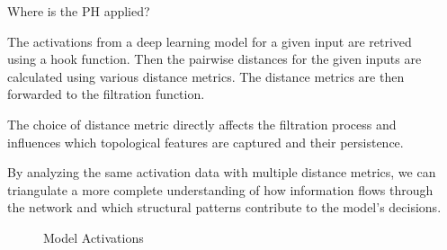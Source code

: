 \documentclass[final]{beamer}
\newlength{\sepwidth}
\newlength{\colwidth}
\newcommand{\separatorcolumn}{\begin{column}{\sepwidth}\end{column}}
\begin{document}
\begin{frame}[t]
\begin{columns}[t]
  \separatorcolumn

  \begin{column}{\colwidth}
  
  
  
      \begin{block} {Where is the PH applied?}

        The activations from a deep learning model for a given input are retrived using a hook function. Then the pairwise distances for the given inputs are calculated using various distance metrics. The distance metrics are then forwarded to the filtration function.       
        
        The choice of distance metric directly affects the filtration process and influences which topological features are captured and their persistence. 
        
        By analyzing the same activation data with multiple distance metrics, we can triangulate a more complete understanding of how information flows through the network and which structural patterns contribute to the model's decisions.  
 
        
        \begin{figure}
            \centering
            
            \caption{Model Activations}
        \end{figure}

       
        \end{block}
    

\end{column}
\end{columns}
\end{frame}
\end{document}
